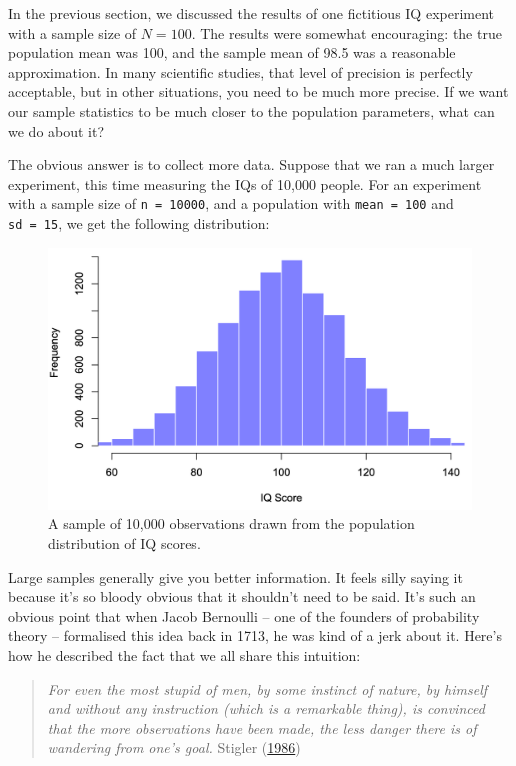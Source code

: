 \documentclass[
]{book}
\theoremstyle{definition}
\theoremstyle{definition}
\theoremstyle{definition}
\theoremstyle{definition}
\theoremstyle{remark}
\begin{document}
In the previous section, we discussed the results of one fictitious IQ experiment with a sample size of \(N=100\). The results were somewhat encouraging: the true population mean was 100, and the sample mean of 98.5 was a reasonable approximation. In many scientific studies, that level of precision is perfectly acceptable, but in other situations, you need to be much more precise. If we want our sample statistics to be much closer to the population parameters, what can we do about it?

The obvious answer is to collect more data. Suppose that we ran a much larger experiment, this time measuring the IQs of 10,000 people. For an experiment with a sample size of \texttt{n\ =\ 10000}, and a population with \texttt{mean\ =\ 100} and \texttt{sd\ =\ 15}, we get the following distribution:

\begin{figure}

{\centering \includegraphics[width=0.66\linewidth]{resources/image/IQdistc} 

}

\caption{A sample of 10,000 observations drawn from the population distribution of IQ scores.}\label{fig:IQdistc}
\end{figure}

Large samples generally give you better information. It feels silly saying it because it's so bloody obvious that it shouldn't need to be said. It's such an obvious point that when Jacob Bernoulli -- one of the founders of probability theory -- formalised this idea back in 1713, he was kind of a jerk about it. Here's how he described the fact that we all share this intuition:

\begin{quote}
\emph{For even the most stupid of men, by some instinct of nature, by himself and without any instruction (which is a remarkable thing), is convinced that the more observations have been made, the less danger there is of wandering from one's goal.} Stigler (\protect\hyperlink{ref-Stigler1986}{1986})
\end{quote}
\end{document}

